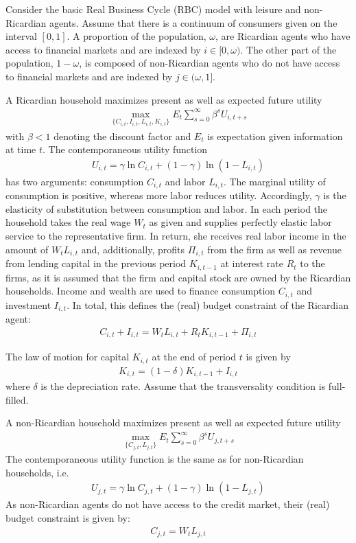 Consider the basic Real Business Cycle (RBC) model with leisure and non-Ricardian agents. Assume that there is a continuum of consumers given on the interval $[0,1]$. A proportion of the population, $\omega$, are Ricardian agents who have access to financial markets and are indexed by $i \in [0,\omega)$. The other part of the population, $1-\omega$, is composed of non-Ricardian agents who do not have access to financial markets and are indexed by $j \in (\omega,1]$.

A Ricardian household maximizes present as well as expected future utility
\begin{align*}
    \underset{\{C_{i,t},I_{i,t},L_{i,t},K_{i,t}\}}{\max} E_t \sum_{s=0}^{\infty} \beta^{s} U_{i,t+s}
\end{align*}
with $\beta <1$ denoting the discount factor and $E_t$ is expectation given information at time $t$. The contemporaneous utility function
\begin{align*}
    U_{i,t} = \gamma \ln C_{i,t} + (1-\gamma) \ln{(1-L_{i,t})}
\end{align*}
has two arguments: consumption $C_{i,t}$ and labor $L_{i,t}$. The marginal utility of consumption is positive, whereas more labor reduces utility. Accordingly, $\gamma$ is the elasticity of substitution between consumption and labor. In each period the household takes the real wage $W_t$ as given and supplies perfectly elastic labor service to the representative firm. In return, she receives real labor income in the amount of $W_t L_{i,t}$ and, additionally, profits $\Pi_{i,t}$ from the firm as well as revenue from lending capital in the previous period $K_{i,t-1}$ at interest rate $R_t$ to the firms, as it is assumed that the firm and capital stock are owned by the Ricardian households. Income and wealth are used to finance consumption $C_{i,t}$ and investment $I_{i,t}$. In total, this defines the (real) budget constraint of the Ricardian agent:
\begin{align*}
    C_{i,t} + I_{i,t} = W_t L_{i,t} + R_t K_{i,t-1} + \Pi_{i,t}
\end{align*}

The law of motion for capital $K_{i,t}$ at the end of period $t$ is given by
\begin{align*}
    K_{i,t} = (1-\delta)K_{i,t-1} + I_{i,t}
\end{align*}
where $\delta$ is the depreciation rate. Assume that the transversality condition is full-filled.

A non-Ricardian household maximizes present as well as expected future utility
\begin{align*}
    \underset{\{C_{j,t},L_{j,t}\}}{\max} E_t \sum_{s=0}^{\infty} \beta^{s} U_{j,t+s}
\end{align*}
The contemporaneous utility function is the same as for non-Ricardian households, i.e.
\begin{align*}
    U_{j,t} = \gamma \ln C_{j,t} + (1-\gamma) \ln{(1-L_{j,t})}
\end{align*}
As non-Ricardian agents do not have access to the credit market, their (real) budget constraint is given by:
\begin{align*}
    C_{j,t} = W_t L_{j,t}
\end{align*}


